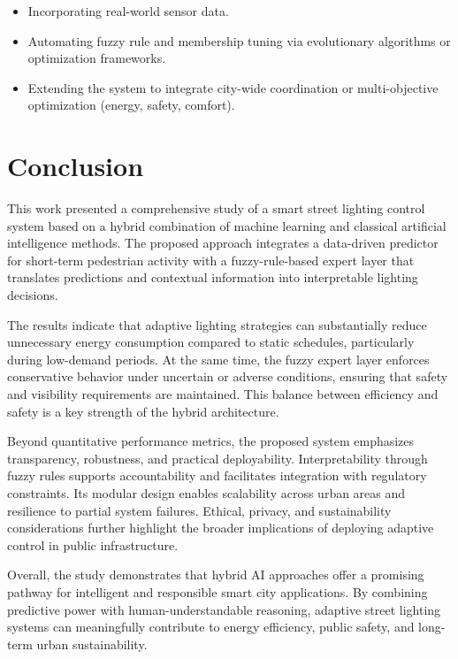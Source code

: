 \documentclass[conference]{IEEEtran}
\begin{document}
\begin{itemize}
\item Incorporating real-world sensor data.
\item Automating fuzzy rule and membership tuning via evolutionary algorithms or optimization frameworks.
\item Extending the system to integrate city-wide coordination or multi-objective optimization (energy, safety, comfort).
\end{itemize}

\section{Conclusion}

This work presented a comprehensive study of a smart street lighting control system based on a hybrid combination of machine learning and classical artificial intelligence methods. The proposed approach integrates a data-driven predictor for short-term pedestrian activity with a fuzzy-rule-based expert layer that translates predictions and contextual information into interpretable lighting decisions.

The results indicate that adaptive lighting strategies can substantially reduce unnecessary energy consumption compared to static schedules, particularly during low-demand periods. At the same time, the fuzzy expert layer enforces conservative behavior under uncertain or adverse conditions, ensuring that safety and visibility requirements are maintained. This balance between efficiency and safety is a key strength of the hybrid architecture.

Beyond quantitative performance metrics, the proposed system emphasizes transparency, robustness, and practical deployability. Interpretability through fuzzy rules supports accountability and facilitates integration with regulatory constraints. Its modular design enables scalability across urban areas and resilience to partial system failures. Ethical, privacy, and sustainability considerations further highlight the broader implications of deploying adaptive control in public infrastructure.

Overall, the study demonstrates that hybrid AI approaches offer a promising pathway for intelligent and responsible smart city applications. By combining predictive power with human-understandable reasoning, adaptive street lighting systems can meaningfully contribute to energy efficiency, public safety, and long-term urban sustainability.
\end{document}
